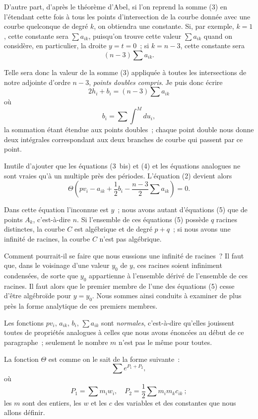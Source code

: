 \documentclass{article}
\begin{document}
D'autre part, d'après le théorème d'Abel, si l'on reprend la somme (3) en l'étendant cette fois à tous les points d'intersection de la courbe donnée avec une courbe quelconque de degré $k$, on obtiendra une constante. Si, par exemple, $k = 1$, cette constante sera $\displaystyle\sum a_{ik}$, puisqu'on trouve cette valeur $\displaystyle\sum a_{ik}$ quand on considère, en particulier, la droite $y = t = 0$~; si $k = n - 3$, cette constante sera
\[
(n - 3) \sum a_{ik}.
\]

Telle sera donc la valeur de la somme (3) appliquée à toutes les intersections de notre adjointe d'ordre $n - 3$, \emph{points doubles compris}. Je puis donc écrire
\[
2 h_{i} + b_{i} = (n - 3) \sum a_{ik} \tag{4}
\]
où
\[
b_{i} = \sum \int^{M} du_{i},
\]
la sommation étant étendue aux points doubles~; chaque point double nous donne deux intégrales correspondant aux deux branches de courbe qui passent par ce point.

Inutile d'ajouter que les équations (3~bis) et (4) et les équations analogues ne sont vraies qu'à un multiple près des périodes. L'équation
(2) devient alors
\[
\Theta\left( p v_{i} - a_{ik} + \frac{1}{2} b_{i} - \frac{n - 3}{2} \sum a_{ik} \right) = 0. \tag{5}
\]

Dans cette équation l'inconnue est $y$~; nous avons autant d'équations (5) que de points $A_{k}$, c'est-à-dire $n$. Si l'ensemble de ces équations (5) possède $q$ racines distinctes, la courbe $C$ est algébrique et de degré $p + q$~; si nous avons une infinité de racines, la courbe $C$ n'est pas algébrique.

Comment pourrait-il se faire que nous eussions une infinité de racines~? Il faut que, dans le voisinage d'une valeur $y_{0}$ de $y$, ces racines soient infiniment condensées, de sorte que $y_{0}$ appartienne à l'ensemble dérivé de l'ensemble de ces racines. Il faut alors que le premier membre de l'une des équations (5) cesse d'être algébroïde pour $y = y_{0}$. Nous sommes ainsi conduits à examiner de plus près la forme analytique de ces premiers membres.

Les fonctions $p v_{i}$, $a_{ik}$, $b_{i}$, $\displaystyle\sum a_{ik}$ sont \emph{normales}, c'est-à-dire qu'elles jouissent toutes de propriétés analogues à celles que nous avons énoncées au début de ce paragraphe~; seulement le nombre $m$ n'est pas le même pour toutes.

La fonction $\Theta$ est comme on le sait de la forme suivante~:
\[
\sum e^{P_{1} + P_{2}},
\]
où
\[
P_{1} = \sum m_{i} w_{i}, \quad P_{2} = \frac{1}{2} \sum m_{i} m_{k} c_{ik}~;
\]
les $m$ sont des entiers, les $w$ et les $c$ des variables et des constantes que nous allons définir.
\end{document}
